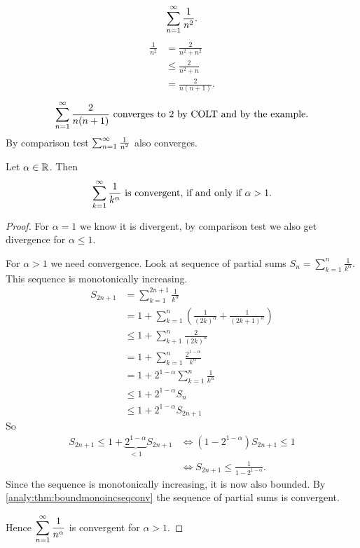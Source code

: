 \documentclass[10pt, a4paper]{article}
\begin{document}
\begin{example}
    \[
    \infsum[n = 1]\frac{1}{n ^ 2}.
    \]
    \begin{align*}
        \frac{1}{n ^ 2} &= \frac{2}{n ^ 2 + n ^ 2} \\
        &\leq \frac{2}{n ^ 2 + n} \\
        &= \frac{2}{n(n + 1)}.
    \end{align*}
    \[
    \infsum[n = 1]\frac{2}{n(n + 1)}\text{ converges to $2$ by COLT and by the example}.
    \]
    By comparison test $\infsum[n = 1]\frac{1}{n ^ 2}$ also converges.
\end{example}

\begin{theorem}
    Let $\alpha \in \R$.
    Then
    \[
    \infsum\frac{1}{k ^ \alpha}\text{ is convergent, if and only if $\alpha > 1$}.
    \]
    \begin{proof}
        For $\alpha = 1$ we know it is divergent,
        by comparison test we also get divergence for $\alpha \leq 1$.

        For $\alpha > 1$ we need convergence.
        Look at sequence of partial sums $\displaystyle S_n = \sum_{k = 1}^{n}\frac{1}{k ^ \alpha}$.
        This sequence is monotonically increasing.
        \begin{align*}
            S_{2n + 1} &= \sum_{k = 1}^{2n + 1}\frac{1}{k ^ \alpha} \\
            &= 1 + \sum_{k = 1}^{n}\left(\frac{1}{(2k) ^ \alpha} + \frac{1}{(2k + 1) ^ \alpha}\right) \\
            &\leq 1 + \sum_{k + 1}^{n}\frac{2}{(2k) ^ \alpha} \\
            &= 1 + \sum_{k = 1}^{n}\frac{2 ^ {1 - \alpha}}{k ^ \alpha} \\
            &= 1 + 2 ^ {1 - \alpha}\sum_{k = 1}^{n}\frac{1}{k ^ \alpha} \\
            &\leq 1 + 2 ^ {1 - \alpha}S_n \\
            &\leq 1 + 2 ^ {1 - \alpha}S_{2n + 1}
        \end{align*}
        So
        \begin{align*}
            S_{2n + 1} \leq 1 + \underbrace{2 ^ {1 - \alpha}}_{< 1}S_{2n + 1} &\iff (1 - 2 ^ {1 - \alpha})S_{2n + 1} \leq 1 \\
            &\iff S_{2n + 1} \leq \frac{1}{1 - 2 ^ {1 - \alpha}}.
        \end{align*}
        Since the sequence is monotonically increasing,
        it is now also bounded.
        By \autoref{analy:thm:boundmonoincseqconv} the sequence of partial sums is convergent.
        
        Hence $\displaystyle\infsum[n = 1]\frac{1}{n ^ \alpha}$ is convergent for $\alpha > 1$.
    \end{proof}
\end{theorem}
\end{document}
